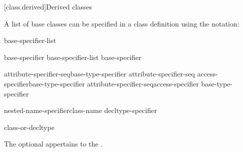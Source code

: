 [class.derived]{Derived classes}%



\pnum
{}%
%
%
A list of base classes can be specified in a class definition using
the notation:

\begin{bnf}
\br
    \terminal{:} base-specifier-list
\end{bnf}


\begin{bnf}
\br
    base-specifier \opt\br
    base-specifier-list \terminal{,} base-specifier \opt
\end{bnf}

\begin{bnf}
\br
    attribute-specifier-seq\opt base-type-specifier\br
    attribute-specifier-seq\opt{}  access-specifier\opt base-type-specifier\br
    attribute-specifier-seq\opt access-specifier \opt base-type-specifier
\end{bnf}

\begin{bnf}
\br
    nested-name-specifier\opt class-name\br
    decltype-specifier
\end{bnf}

\begin{bnf}
\br
    class-or-decltype
\end{bnf}

%
%
\begin{bnf}
\br
    \br
    \br
\end{bnf}

The optional  appertains to the .

